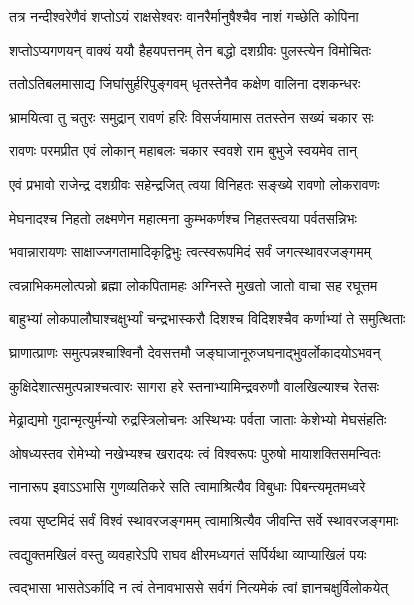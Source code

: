 \twolineshloka
{तत्र नन्दीश्वरेणैवं शप्तोऽयं राक्षसेश्वरः}
{वानरैर्मानुषैश्चैव नाशं गच्छेति कोपिना} %

\twolineshloka
{शप्तोऽप्यगणयन् वाक्यं ययौ हैहयपत्तनम्}
{तेन बद्धो दशग्रीवः पुलस्त्येन विमोचितः} %

\twolineshloka
{ततोऽतिबलमासाद्य जिघांसुर्हरिपुङ्गवम्}
{धृतस्तेनैव कक्षेण वालिना दशकन्धरः} %

\twolineshloka
{भ्रामयित्वा तु चतुरः समुद्रान् रावणं हरिः}
{विसर्जयामास ततस्तेन सख्यं चकार सः} %

\twolineshloka
{रावणः परमप्रीत एवं लोकान् महाबलः}
{चकार स्ववशे राम बुभुजे स्वयमेव तान्} %

\twolineshloka
{एवं प्रभावो राजेन्द्र दशग्रीवः सहेन्द्रजित्}
{त्वया विनिहतः सङ्ख्ये रावणो लोकरावणः} %

\twolineshloka
{मेघनादश्च निहतो लक्ष्मणेन महात्मना}
{कुम्भकर्णश्च निहतस्त्वया पर्वतसन्निभः} %

\twolineshloka
{भवान्नारायणः साक्षाज्जगतामादिकृद्विभुः}
{त्वत्स्वरूपमिदं सर्वं जगत्स्थावरजङ्गमम्} %

\twolineshloka
{त्वन्नाभिकमलोत्पन्नो ब्रह्मा लोकपितामहः}
{अग्निस्ते मुखतो जातो वाचा सह रघूत्तम} %

\twolineshloka
{बाहुभ्यां लोकपालौघाश्चक्षुर्भ्यां चन्द्रभास्करौ}
{दिशश्च विदिशश्चैव कर्णाभ्यां ते समुत्थिताः} %

\twolineshloka
{घ्राणात्प्राणः समुत्पन्नश्चाश्विनौ देवसत्तमौ}
{जङ्घाजानूरुजघनाद्भुवर्लोकादयोऽभवन्} %

\twolineshloka
{कुक्षिदेशात्समुत्पन्नाश्चत्वारः सागरा हरे}
{स्तनाभ्यामिन्द्रवरुणौ वालखिल्याश्च रेतसः} %

\twolineshloka
{मेढ्राद्यमो गुदान्मृत्युर्मन्यो रुद्रस्त्रिलोचनः}
{अस्थिभ्यः पर्वता जाताः केशेभ्यो मेघसंहतिः} %

\twolineshloka
{ओषध्यस्तव रोमेभ्यो नखेभ्यश्च खरादयः}
{त्वं विश्वरूपः पुरुषो मायाशक्तिसमन्वितः} %

\twolineshloka
{नानारूप इवाऽऽभासि गुणव्यतिकरे सति}
{त्वामाश्रित्यैव विबुधाः पिबन्त्यमृतमध्वरे} %

\twolineshloka
{त्वया सृष्टमिदं सर्वं विश्वं स्थावरजङ्गमम्}
{त्वामाश्रित्यैव जीवन्ति सर्वे स्थावरजङ्गमाः} %

\twolineshloka
{त्वद्युक्तमखिलं वस्तु व्यवहारेऽपि राघव}
{क्षीरमध्यगतं सर्पिर्यथा व्याप्याखिलं पयः} %

\twolineshloka
{त्वद्भासा भासतेऽर्कादि न त्वं तेनावभाससे}
{सर्वगं नित्यमेकं त्वां ज्ञानचक्षुर्विलोकयेत्} %

